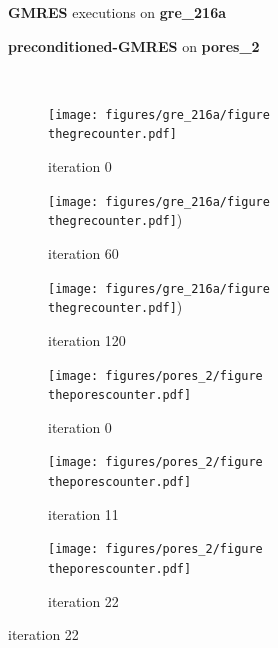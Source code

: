 \documentclass[twoside]{article}
\newcounter{fig}\setcounter{fig}{0}
\begin{document}
  \begin{figure}[H]
    \centering
    
    \begin{minipage}[b]{0.45\linewidth}
      \centering
      \textbf{GMRES} executions on \textbf{gre_216a} 
    \end{minipage}
    \quad
    \begin{minipage}{0.45\linewidth}
      \centering
      \textbf{preconditioned-GMRES} on \textbf{pores_2}
    \end{minipage}\\


    \begin{minipage}[b]{0.48\linewidth}
      \begin{subfigure}[t]{\linewidth}
        \centering
        \texttt{[image: figures/gre\_216a/figure\\thegrecounter.pdf]}
        \caption{iteration 0}\label{fig:gre_216a_conv_hist_iteration_0}		
      \end{subfigure}
      \quad
      \begin{subfigure}[t]{\linewidth}
        \centering
        \texttt{[image: figures/gre\_216a/figure\\thegrecounter.pdf]})
        \caption{iteration 60}\label{fig:gre_216a_conv_hist_iteration_1}
      \end{subfigure}
      \quad
      \begin{subfigure}[t]{\linewidth}
        \centering
        \texttt{[image: figures/gre\_216a/figure\\thegrecounter.pdf]})
        \caption{iteration 120}\label{fig:gre_216a_conv_hist_iteration_2}
      \end{subfigure}
    \end{minipage}
    \quad
    \begin{minipage}[b]{0.48\linewidth}
      \begin{subfigure}[t]{\linewidth}
        \centering
        \texttt{[image: figures/pores\_2/figure\\theporescounter.pdf]}
        \caption{iteration 0}\label{fig:pores_2_conv_hist_iteration_0}		
      \end{subfigure}
      \quad
      \begin{subfigure}[t]{\linewidth}
        \centering
        \texttt{[image: figures/pores\_2/figure\\theporescounter.pdf]}
        \caption{iteration 11}\label{fig:pores_2_conv_hist_iteration_1}
      \end{subfigure}
      \quad
      \begin{subfigure}[t]{\linewidth}
        \centering
        \texttt{[image: figures/pores\_2/figure\\theporescounter.pdf]}
        \caption{iteration 22}\label{fig:pores_2_conv_hist_iteration_2}
      \end{subfigure}


\end{minipage}
\end{figure}
\end{document}
